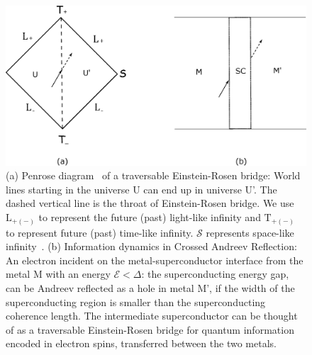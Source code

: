 \documentclass[10pt,letterpaper,aps,onecolumn,superscriptaddress,floatfix,notitlepage]{revtex4-1}
\begin{document}
	\begin{figure}
		\includegraphics[scale=0.4]{fig6.eps}
		\caption{(a) Penrose diagram~\cite{penrose2011republication} of a traversable Einstein-Rosen bridge: World lines starting in the universe U can end up in universe U'. The dashed vertical line is the throat of Einstein-Rosen bridge. We use $\text{L}_{+(-)}$ to represent the future (past) light-like infinity and $\text{T}_{+(-)}$ to represent future (past) time-like infinity. $\mathcal{S}$ represents space-like infinity~\cite{penrose}. (b) Information dynamics in Crossed Andreev Reflection: An electron incident on the metal-superconductor interface from the metal M with an energy $\mathcal{E} <\Delta$: the superconducting energy gap, can be Andreev reflected as a hole in metal M', if the width of the superconducting region is smaller than the superconducting coherence length. The intermediate superconductor can be thought of as a traversable Einstein-Rosen bridge for quantum information encoded in electron spins, transferred between the two metals.\label{car}}
	\end{figure}
\end{document}
